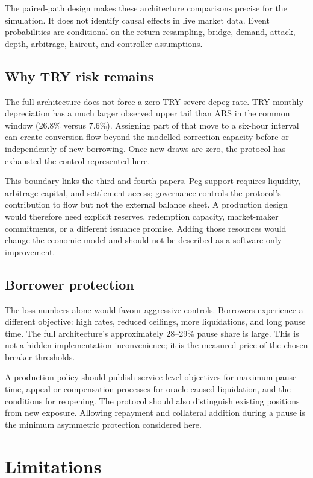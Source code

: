 \documentclass[sn-vancouver,Numbered]{sn-jnl}
\begin{document}
The paired-path design makes these architecture comparisons precise for the simulation. It does not identify causal effects in live market data. Event probabilities are conditional on the return resampling, bridge, demand, attack, depth, arbitrage, haircut, and controller assumptions.

\subsection{Why TRY risk remains}

The full architecture does not force a zero TRY severe-depeg rate. TRY monthly depreciation has a much larger observed upper tail than ARS in the common window (26.8\% versus 7.6\%). Assigning part of that move to a six-hour interval can create conversion flow beyond the modelled correction capacity before or independently of new borrowing. Once new draws are zero, the protocol has exhausted the control represented here.

This boundary links the third and fourth papers. Peg support requires liquidity, arbitrage capital, and settlement access; governance controls the protocol's contribution to flow but not the external balance sheet. A production design would therefore need explicit reserves, redemption capacity, market-maker commitments, or a different issuance promise. Adding those resources would change the economic model and should not be described as a software-only improvement.

\subsection{Borrower protection}

The loss numbers alone would favour aggressive controls. Borrowers experience a different objective: high rates, reduced ceilings, more liquidations, and long pause time. The full architecture's approximately 28--29\% pause share is large. This is not a hidden implementation inconvenience; it is the measured price of the chosen breaker thresholds.

A production policy should publish service-level objectives for maximum pause time, appeal or compensation processes for oracle-caused liquidation, and the conditions for reopening. The protocol should also distinguish existing positions from new exposure. Allowing repayment and collateral addition during a pause is the minimum asymmetric protection considered here.

\section{Limitations}\label{sec:limitations}
\end{document}
